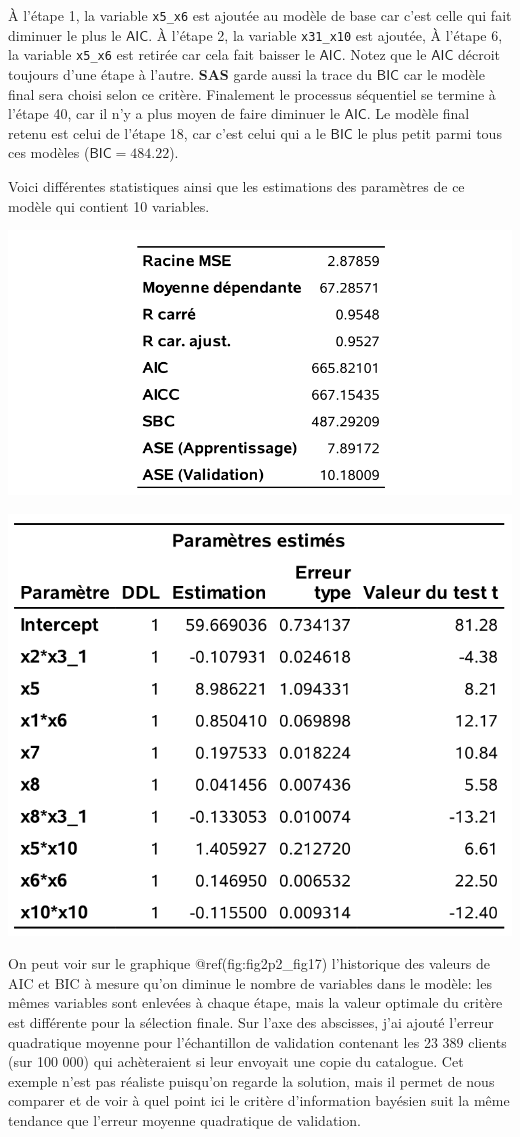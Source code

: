 \documentclass[
  11pt,
  letterpaper,
]{book}
\theoremstyle{definition}
\theoremstyle{definition}
\theoremstyle{definition}
\theoremstyle{definition}
\theoremstyle{remark}
\begin{document}
À l'étape 1, la variable \texttt{x5\_x6} est ajoutée au modèle de base car c'est celle qui fait diminuer le plus le \(\mathsf{AIC}\). À l'étape 2, la variable \texttt{x31\_x10} est ajoutée, À l'étape 6, la variable \texttt{x5\_x6} est retirée car cela fait baisser le \(\mathsf{AIC}\). Notez que le \(\mathsf{AIC}\) décroit toujours d'une étape à l'autre. \textbf{SAS} garde aussi la trace du \(\mathsf{BIC}\) car le modèle final sera choisi selon ce critère. Finalement le processus séquentiel se termine à l'étape 40, car il n'y a plus moyen de faire diminuer le \(\mathsf{AIC}\). Le modèle final retenu est celui de l'étape 18, car c'est celui qui a le \(\mathsf{BIC}\) le plus petit parmi tous ces modèles (\(\mathsf{BIC}=484.22\)).

Voici différentes statistiques ainsi que les estimations des paramètres de ce modèle qui contient 10 variables.

\begin{center}\includegraphics[width=0.65\linewidth]{figures/02-select-e10} \end{center}

\begin{center}\includegraphics[width=0.7\linewidth]{figures/02-select-e11} \end{center}

On peut voir sur le graphique @ref(fig:fig2p2\_fig17) l'historique des valeurs de AIC et BIC à mesure qu'on diminue le nombre de variables dans le modèle: les mêmes variables sont enlevées à chaque étape, mais la valeur optimale du critère est différente pour la sélection finale.
Sur l'axe des abscisses, j'ai ajouté l'erreur quadratique moyenne pour l'échantillon de validation contenant les 23 389 clients (sur 100 000) qui achèteraient si leur envoyait une copie du catalogue. Cet exemple n'est pas réaliste puisqu'on regarde la solution, mais il permet de nous comparer et de voir à quel point ici le critère d'information bayésien suit la même tendance que l'erreur moyenne quadratique de validation.
\end{document}
